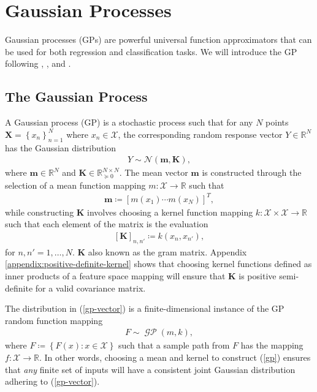 \documentclass{article}
\newcommand{\GP}{\operatorname{\mathcal{GP}}}
\numberwithin{equation}{section}
\begin{document}
\newpage
\section{Gaussian Processes}\label{section:gaussian-processes}
Gaussian processes (GPs) are powerful universal function approximators that can be used for both regression and classification tasks. We will introduce the GP following \cite{rasmussen2003gaussian}, \cite{matthews2017scalable}, and \cite{wild2022generalized}.

\subsection{The Gaussian Process}\label{section:the-gp}
A Gaussian process (GP) is a stochastic process such that for any $N$ points $\mathbf{X} = \left\{ x_n\right\}_{n=1}^N$ where $x_n \in \mathcal{X}$, the corresponding random response vector $Y \in \mathbb{R}^N$ has the Gaussian distribution
\begin{align}
    \label{gp-vector}
    Y \sim \mathcal{N}\left(\mathbf{m}, \mathbf{K}\right),
\end{align}
where $\mathbf{m} \in \mathbb{R}^N$ and $\mathbf{K} \in  \mathbb{R}^{N \times N}_{\succcurlyeq 0}$.
The mean vector $\mathbf{m}$ is constructed through the selection of a mean function mapping $m: \mathcal{X} \rightarrow \mathbb{R}$ such that
\begin{align}
    \label{gp-mean-vector}
    \mathbf{m} \coloneqq \left[ m(x_1) \cdots m(x_N)\right]^T,
\end{align}
while constructing $\mathbf{K}$ involves choosing a kernel function mapping $k: \mathcal{X} \times \mathcal{X} \rightarrow \mathbb{R}$ such that each element of the matrix is the evaluation
\begin{align}
    \label{gp-kernel-matrix}
    \left[\mathbf{K}\right]_{n, n'} \coloneqq k(x_n, x_{n'}),
\end{align}
for $n, n'=1,\dots, N$.
$\mathbf{K}$ also known as the gram matrix.
Appendix \ref{appendix:positive-definite-kernel} shows that choosing kernel functions defined as inner products of a feature space mapping will ensure that $\mathbf{K}$ is positive semi-definite for a valid covariance matrix.


The distribution in (\ref{gp-vector}) is a finite-dimensional instance of the GP random function mapping
\begin{align}
    F \sim \GP(m, k),
    \label{gp}
\end{align}
 where $F \coloneqq \left\{F(x): x \in \mathcal{X}\right\}$ such that a sample path from $F$ has the mapping $f: \mathcal{X} \rightarrow \mathbb{R}$.
In other words, choosing a mean and kernel to construct (\ref{gp}) ensures that \textit{any} finite set of inputs will have a consistent joint Gaussian distribution adhering to (\ref{gp-vector}).
\end{document}
